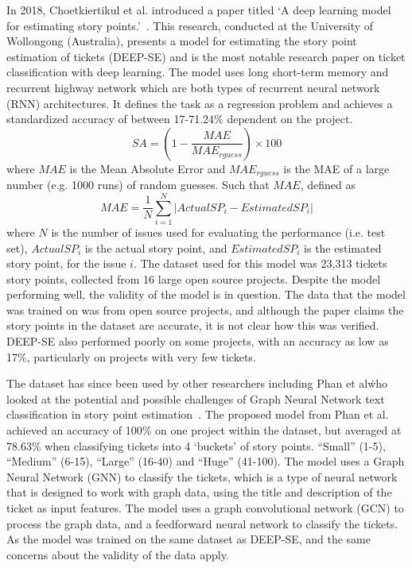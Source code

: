 \documentclass{UoYCSproject}
\begin{document}
    In 2018, Choetkiertikul et al.
    introduced a paper titled `A deep learning model for estimating story points.'~\cite{8255666}.
    This research, conducted at the University of Wollongong (Australia), presents a model for estimating the story point estimation of tickets (DEEP-SE) and is the most notable research paper on ticket classification with deep learning.
    The model uses long short-term memory and recurrent highway network which are both types of recurrent neural network (RNN) architectures.
    It defines the task as a regression problem and achieves a standardized accuracy of between 17-71.24\% dependent on the project.
    \[SA = (1-\frac{MAE}{MAE_{rguess}}) \times 100\]
    where $MAE$ is the Mean Absolute Error and $MAE_{rguess}$ is the MAE of a large number (e.g. 1000 runs) of random guesses. Such that $MAE$, defined as \[ MAE = \frac{1}{N}\sum_{i=1}^{N}|ActualSP_{i} - EstimatedSP_{i}|\] where $N$ is the number of issues used for evaluating the performance (i.e. test set), $ActualSP_i$ is the actual story point, and $EstimatedSP_i$ is the estimated story point, for the issue $i$.
    The dataset used for this model was 23,313 tickets story points, collected from 16 large open source projects.
    Despite the model performing well, the validity of the model is in question.
    The data that the model was trained on was from open source projects, and although the paper claims the story points in the dataset are accurate, it is not clear how this was verified. DEEP-SE also performed poorly on some projects, with an accuracy as low as 17\%, particularly on projects with very few tickets.

    The dataset has since been used by other researchers including Phan et al\. who looked at the potential and possible challenges of Graph Neural Network text
    classification in story point estimation~\cite{phan2022story}.
    The proposed model from Phan et al. achieved an accuracy of 100\% on one project within the dataset, but averaged at 78.63\% when classifying tickets into 4 `buckets' of story points. ``Small'' (1-5), ``Medium'' (6-15), ``Large'' (16-40) and ``Huge'' (41-100).
    The model uses a Graph Neural Network (GNN) to classify the tickets, which is a type of neural network that is designed to work with graph data, using the title and description of the ticket as input features. The model uses a graph convolutional network (GCN) to process the graph data, and a feedforward neural network to classify the tickets.
    As the model was trained on the same dataset as DEEP-SE, and the same concerns about the validity of the data apply.
\end{document}
